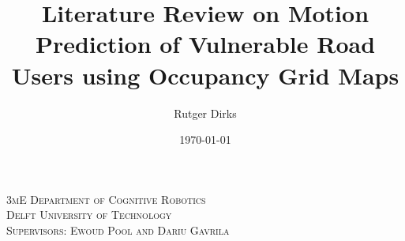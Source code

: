 \documentclass[a4paper]{article}
\title{Literature Review on Motion Prediction of Vulnerable Road Users using Occupancy Grid Maps}
\author{Rutger Dirks}
\date{\today{}}
\begin{document}
	\selectfont %
	
	\begin{titlepage}

		\maketitle{}
		
		\begin{center}
			\textsc{3mE Department of Cognitive Robotics}\\[1cm]
			\textsc{\LARGE Delft University of Technology}\\[1cm]
			\textsc{Supervisors: Ewoud Pool and Dariu Gavrila}\\[5cm]
		\end{center}


		

	\end{titlepage}
	 \selectfont	
	\newpage
	\printnoidxglossary[type=acronym]
	\printacronyms
	\newpage
	\tableofcontents{}	
	\newpage	
	
	\newpage
	
	\newpage
	
	\newpage
	
	\newpage
	
	\newpage
	
	\newpage
	
	\newpage
	\appendix
	
	\newpage
	
	
	
	\newpage
	
	
	
	
	
\end{document}
